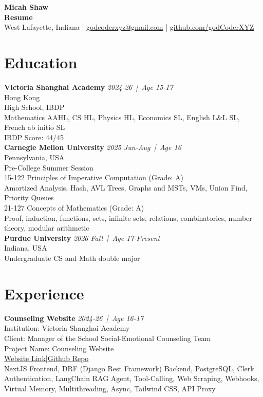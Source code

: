 \documentclass[a4paper,9pt]{extarticle}
\newcommand{\entryheader}[3]{%
    \noindent\textbf{#1} \hfill \textit{#2 \,|\, Age #3}
}
\begin{document}
\pagestyle{empty}

\begin{center}
    \textbf{\Large Micah Shaw }\\[3pt] %
    \textbf{Resume}\\[1pt] %
    West Lafayette, Indiana | \href{mailto:godcoderxyz@gmail.com}{godcoderxyz@gmail.com} | \href{https://github.com/godCoderXYZ}{github.com/godCoderXYZ}
\end{center}

\section*{Education}
    \noindent
    \entryheader{Victoria Shanghai Academy}{2024-26}{15-17} \\
    Hong Kong \\
    High School, IBDP \\
    Mathematics AAHL, CS HL, Physics HL, Economics SL, English L\&L SL, 
    French ab initio SL\\
    IBDP Score: 44/45\\

    \noindent
    \entryheader{Carnegie Mellon University}{2025 Jun-Aug}{16} \\
    Pennsylvania, USA \\
    Pre-College Summer Session \\
    15-122 Principles of Imperative Computation (Grade: A) \\
    Amortized Analysis, Hash, AVL Trees, Graphs and MSTs, VMs, Union Find, Priority Queues \\
    21-127 Concepts of Mathematics (Grade: A) \\
    Proof, induction, functions, sets, infinite sets, relations, combinatorics, number theory, modular arithmetic \\

    \noindent
    \entryheader{Purdue University}{2026 Fall}{17-Present} \\
    Indiana, USA \\
    Undergraduate CS and Math double major \\

\section*{Experience}
    \noindent
    \entryheader{Counseling Website}{2024-26}{16-17} \\
    Institution: Victoria Shanghai Academy \\
    Client: Manager of the School Social-Emotional Counseling Team \\
    Project Name: Counseling Website \\
    \href{https://counseling-website.vercel.app/}{Website Link}|\href{https://github.com/godCoderXYZ/counseling_website}{Github Repo} \\
    NextJS Frontend, DRF (Django Rest Framework) Backend, PostgreSQL, Clerk Authentication, LangChain RAG Agent, Tool-Calling, Web Scraping, Webhooks, Virtual Memory, Multithreading, Async, Tailwind CSS, API Proxy \\
\end{document}
